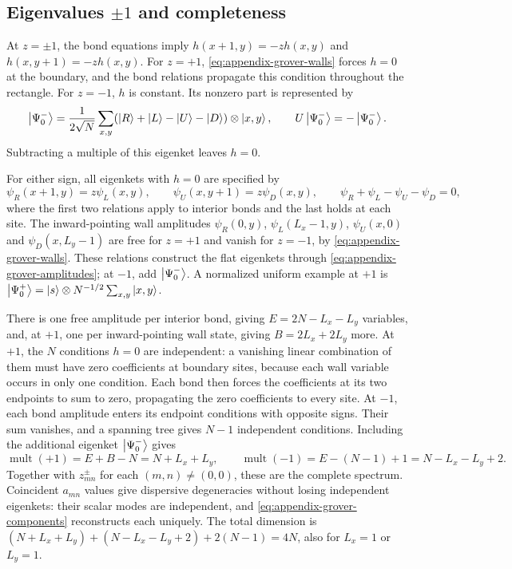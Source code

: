 \subsection{Eigenvalues \texorpdfstring{$\pm1$}{+1 and -1} and completeness}

At $z=\pm1$, the bond equations imply $h(x+1,y)=-zh(x,y)$ and
$h(x,y+1)=-zh(x,y)$. For $z=+1$, \eqref{eq:appendix-grover-walls} forces
$h=0$ at the boundary, and the bond relations propagate this condition
throughout the rectangle. For $z=-1$, $h$ is constant. Its nonzero part is
represented by
\begin{equation}
 \ket{\Psi_0^-}=\frac{1}{2\sqrt N}\sum_{x,y}
  (\ket{R}+\ket{L}-\ket{U}-\ket{D})\otimes\ket{x,y},
 \qquad U\ket{\Psi_0^-}=-\ket{\Psi_0^-}.
 \label{eq:appendix-grover-zero-minus}
\end{equation}
Subtracting a multiple of this eigenket leaves $h=0$.

For either sign, all eigenkets with $h=0$ are specified by
\begin{equation}
 \psi_R(x+1,y)=z\psi_L(x,y),\qquad
 \psi_U(x,y+1)=z\psi_D(x,y),\qquad
 \psi_R+\psi_L-\psi_U-\psi_D=0,
 \label{eq:appendix-grover-flat-eigenvectors}
\end{equation}
where the first two relations apply to interior bonds and the last holds
at each site. The inward-pointing wall amplitudes
$\psi_R(0,y)$, $\psi_L(L_x-1,y)$, $\psi_U(x,0)$ and $\psi_D(x,L_y-1)$
are free for $z=+1$ and vanish for $z=-1$, by
\eqref{eq:appendix-grover-walls}. These relations construct the flat
eigenkets through \eqref{eq:appendix-grover-amplitudes}; at $-1$, add
$\ket{\Psi_0^-}$. A normalized uniform example at $+1$ is
$\ket{\Psi_0^+}=\ket{s}\otimes N^{-1/2}\sum_{x,y}\ket{x,y}$.

There is one free amplitude per interior bond, giving
$E=2N-L_x-L_y$ variables, and, at $+1$, one per inward-pointing wall
state, giving $B=2L_x+2L_y$ more. At $+1$, the $N$ conditions $h=0$
are independent: a vanishing linear combination of them must have zero
coefficients at boundary sites, because each wall variable occurs in only
one condition. Each bond then forces the coefficients at its two endpoints
to sum to zero, propagating the zero coefficients to every site.
At $-1$, each bond amplitude enters its endpoint conditions with opposite
signs. Their sum vanishes, and a spanning tree gives $N-1$ independent
conditions. Including the additional eigenket $\ket{\Psi_0^-}$ gives
\begin{equation}
 \operatorname{mult}(+1)=E+B-N=N+L_x+L_y,\qquad
 \operatorname{mult}(-1)=E-(N-1)+1=N-L_x-L_y+2.
 \label{eq:appendix-grover-multiplicities}
\end{equation}
Together with $z_{mn}^{\pm}$ for each $(m,n)\neq(0,0)$, these are the
complete spectrum. Coincident $a_{mn}$ values give dispersive degeneracies
without losing independent eigenkets: their scalar modes are independent,
and \eqref{eq:appendix-grover-components} reconstructs each uniquely.
The total dimension is
$(N+L_x+L_y)+(N-L_x-L_y+2)+2(N-1)=4N$, also for $L_x=1$ or $L_y=1$.


